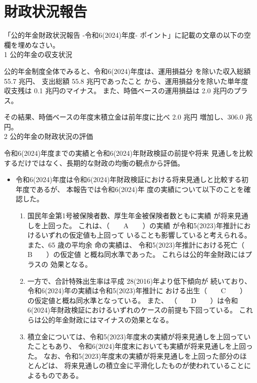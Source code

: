 \section{財政状況報告}

\begin{fillblank}[自作 2026/11/7]
  「公的年金財政状況報告 -令和6(2024)年度- ポイント」に記載の文章の以下の空欄を埋めなさい。
\\

  1 公的年金の収支状況

  公的年金制度全体でみると、令和6(2024)年度は、運用損益分 を除いた収入総額 55.7 兆円、
  支出総額 55.8 兆円であったこと から、運用損益分を除いた単年度収支残は 0.1 兆円のマイナス。 
  また、時価ベースの運用損益は 2.0 兆円のプラス。

  その結果、時価ベースの年度末積立金は前年度に比べ 2.0 兆円 増加し、306.0 兆円。
\\

2 公的年金の財政状況の評価

令和6(2024)年度までの実績と令和6(2024)年財政検証の前提や将来
見通しを比較するだけではなく、長期的な財政の均衡の観点から評価。

\begin{itemize}
  \item 令和6(2024)年度は令和6(2024)年財政検証における将来見通しと比較する初年度であるが、
  本報告では令和6(2024)年 度の実績について以下のことを確認した。
  \begin{enumerate}[(1)]
    \item 国民年金第1号被保険者数、厚生年金被保険者数ともに実績 が将来見通しを上回った。
    これは、（　　A　　）の実績 が令和5(2023)年推計におけるいずれの仮定値も上回って
    いることも影響していると考えられる。また、65 歳の平均余 命の実績は、
    令和5(2023)年推計における死亡（　　B　　）の仮定値 と概ね同水準であった。
    これらは公的年金財政にはプラスの 効果となる。

    \item 一方で、合計特殊出生率は平成 28(2016)年より低下傾向が 続いており、
    令和6(2024)年の実績は令和5(2023)年推計に おける出生（　　C　　）の仮定値と概ね同水準となっている。
    また、 （　　D　　）は令和6(2024)年財政検証におけるいずれのケースの前提も下回っている。
    これらは公的年金財政にはマイナスの効果となる。

    \item 積立金については、令和5(2023)年度末の実績が将来見通しを上回っていたこともあり、
    令和6(2024)年度末においても実績が将来見通しを上回った。
    なお、令和5(2023)年度末の実績が将来見通しを上回った部分のほとんどは、
    将来見通しの積立金に平滑化したものが使われていることによるものである。


\end{enumerate}
\end{itemize}
\end{fillblank}
